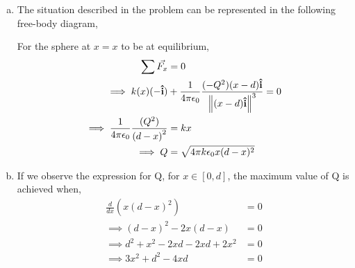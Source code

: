 \begin{problem}{}{}
\begin{enumerate}[(a)]
    \item  { The situation described in the problem can be represented in the following free-body diagram,
        \begin{figure}[H]
        \centering
    \end{figure} 
    For the sphere at $x = x$ to be at equilibrium, 
    \begin{align*}
        \sum \vec{F_x} &= 0\\
        \implies k(x)(-\boldsymbol{\hat{\textbf{i}}}) &+ \frac{1}{4\pi\epsilon_0}\frac{(-Q^2)(x - d)\boldsymbol{\hat{\textbf{i}}}}{\left \Vert (x-d)\boldsymbol{\hat{\textbf{i}}}\right \Vert^3} = 0\\
        \implies \frac{1}{4\pi\epsilon_0}\frac{(Q^2)}{\left (d-x\right )^2} &= kx\\
        \implies Q &= \sqrt{4\pi k\epsilon_0x(d-x)^2}
        \end{align*}
        }
    \item
        If we observe the expression for Q, for $x \in [0, d]$, the maximum value of Q is achieved when,
            \begin{align*}
                \frac{d}{dx}\left( x(d-x)^2\right) &= 0\\
                \implies (d-x)^2 -2x(d-x) &= 0\\
                \implies d^2 + x^2 - 2xd -2xd + 2x^2 &= 0\\
                \implies 3x^2 + d^2 - 4xd &= 0\\

\end{align*}
\end{enumerate}
\end{problem}
